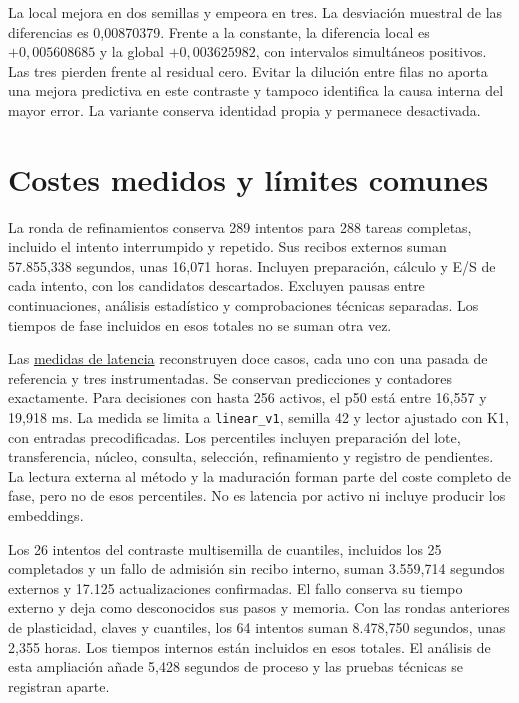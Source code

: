 \documentclass[11pt,a4paper]{report}
\begin{document}
La local mejora en dos semillas y empeora en tres. La desviación muestral
de las diferencias es 0,00870379. Frente a la constante, la diferencia
local es $+0{,}005608685$ y la global $+0{,}003625982$, con intervalos
simultáneos positivos. Las tres pierden frente al residual cero.
Evitar la dilución entre filas no aporta una mejora predictiva en este
contraste y tampoco identifica la causa interna del mayor error. La
variante conserva identidad propia y permanece desactivada.

\section{Costes medidos y límites comunes}
La ronda de refinamientos conserva 289 intentos para 288 tareas completas,
incluido el intento interrumpido y repetido. Sus recibos externos suman
57.855,338 segundos, unas 16,071 horas. Incluyen preparación, cálculo y E/S
de cada intento, con los candidatos descartados. Excluyen pausas entre
continuaciones, análisis estadístico y comprobaciones técnicas separadas.
Los tiempos de fase incluidos en esos totales no se suman otra vez.

Las \href{https://github.com/GonxKZ/mars-titan/blob/8b7e2a5600be568cc1299f2a661da15b5090c45e/reports/engineering/refinement-selected-latency-20261019/README.md}{medidas de latencia}
reconstruyen doce casos, cada uno con una pasada de referencia y tres
instrumentadas. Se conservan predicciones y contadores exactamente. Para
decisiones con hasta 256 activos, el p50 está entre 16,557 y 19,918 ms.
La medida se limita a \texttt{linear\_v1}, semilla 42 y lector ajustado con K1,
con entradas precodificadas. Los percentiles incluyen preparación del lote,
transferencia, núcleo, consulta, selección, refinamiento y registro de
pendientes. La lectura externa al método y la maduración forman parte del
coste completo de fase, pero no de esos percentiles. No es latencia por activo
ni incluye producir los embeddings.

Los 26 intentos del contraste multisemilla de cuantiles, incluidos los
25 completados y un fallo de admisión sin recibo interno, suman
3.559,714 segundos externos y 17.125 actualizaciones confirmadas. El fallo
conserva su tiempo externo y deja como desconocidos sus pasos y memoria.
Con las rondas anteriores de plasticidad, claves y cuantiles, los 64 intentos
suman 8.478,750 segundos, unas 2,355 horas. Los tiempos internos están
incluidos en esos totales. El análisis de esta ampliación añade
5,428 segundos de proceso y las pruebas técnicas se registran aparte.
\end{document}
